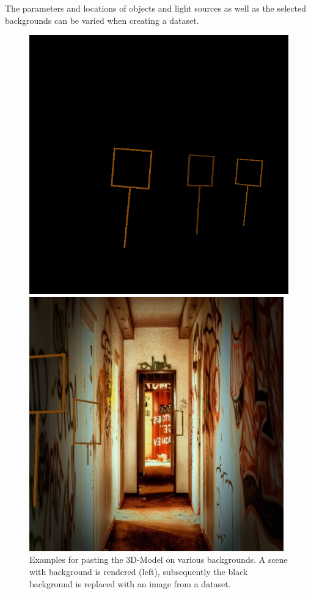 The parameters and locations of objects and light sources as well as the selected backgrounds can be varied when creating a dataset.

\begin{figure}[hbtp]
	\centering
	\begin{minipage}{0.49\textwidth}
		\includegraphics[width=\textwidth]{fig/shot}
	\end{minipage}
	\begin{minipage}{0.49\textwidth}
		\includegraphics[width=\textwidth]{fig/random_bg2}
	\end{minipage}
	\caption{Examples for pasting the 3D-Model on various backgrounds. A scene with background is rendered (left), subsequently the black background is replaced with an image from a dataset.}
	\label{fig:random_bg}
\end{figure}

